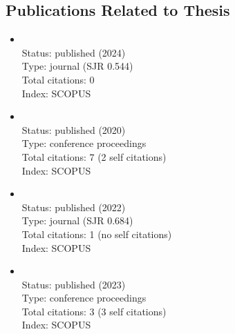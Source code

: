 \begin{refsection}
\section*{Publications Related to Thesis}
    \begin{itemize}
		\item{}\vspace{2mm}\\Status: published (2024)\\Type: journal (SJR 0.544)\\Total citations: 0\\Index: SCOPUS
		\item{}\vspace{2mm}\\Status: published (2020)\\Type: conference proceedings\\Total citations: 7 (2 self citations)\\Index: SCOPUS
		\item{}\vspace{2mm}\\Status: published (2022)\\Type: journal (SJR 0.684)\\Total citations: 1 (no self citations)\\Index: SCOPUS
		\item{}\vspace{2mm}\\Status: published (2023)\\Type: conference proceedings\\Total citations: 3 (3 self citations)\\Index: SCOPUS
\end{itemize}

\newpage

\end{refsection}
